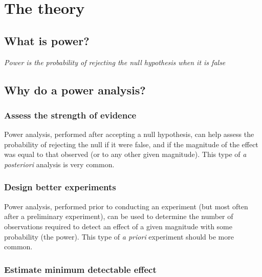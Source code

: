 \documentclass[
  12pt,
]{book}
\begin{document}
\hypertarget{the-theory}{%
\section{The theory}\label{the-theory}}

\hypertarget{what-is-power}{%
\subsection{What is power?}\label{what-is-power}}

\emph{Power is the probability of rejecting the null hypothesis when it is false}

\hypertarget{why-do-a-power-analysis}{%
\subsection{Why do a power analysis?}\label{why-do-a-power-analysis}}

\hypertarget{assess-the-strength-of-evidence}{%
\subsubsection*{Assess the strength of evidence}\label{assess-the-strength-of-evidence}}

Power analysis, performed after accepting a null hypothesis, can help assess the probability of rejecting the null if it were false, and if the magnitude of the effect was equal to that observed (or to any other given magnitude). This type of \emph{a posteriori} analysis is very common.

\hypertarget{design-better-experiments}{%
\subsubsection*{Design better experiments}\label{design-better-experiments}}

Power analysis, performed prior to conducting an experiment (but most often after a preliminary experiment), can be used to determine the number of observations required to detect an effect of a given magnitude with some probability (the power). This type of \emph{a priori} experiment should be more common.

\hypertarget{estimate-minimum-detectable-effect}{%
\subsubsection*{Estimate minimum detectable effect}\label{estimate-minimum-detectable-effect}}
\end{document}
